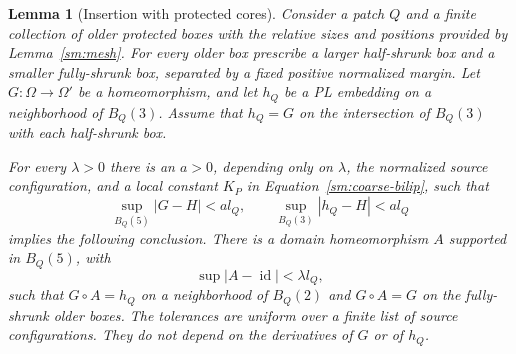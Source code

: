 \documentclass[11pt]{article}
\numberwithin{equation}{section}
\newtheorem{lemma}[theorem]{Lemma}
\theoremstyle{definition}
\theoremstyle{remark}
\begin{document}
\begin{lemma}[Insertion with protected cores]
\label{sm:insertion}
Consider a patch $Q$ and a finite collection of older protected
boxes with the relative sizes and positions provided by
Lemma~\ref{sm:mesh}.  For every older box prescribe a larger
half-shrunk box and a smaller fully-shrunk box, separated by a
fixed positive normalized margin.  Let $G:\Omega\to\Omega'$ be
a homeomorphism, and let $h_Q$ be a PL embedding on a neighborhood
of $B_Q(3)$.  Assume that $h_Q=G$ on the intersection of
$B_Q(3)$ with each half-shrunk box.

For every $\lambda>0$ there is an $a>0$, depending only on
$\lambda$, the normalized source configuration, and a local
constant $K_P$ in Equation~\eqref{sm:coarse-bilip}, such that
\begin{equation}
 \label{sm:insertion-smallness}
 \sup_{B_Q(5)}|G-H|<a l_Q,
 \qquad \sup_{B_Q(3)}|h_Q-H|<a l_Q
\end{equation}
implies the following conclusion.  There is a domain
homeomorphism $A$ supported in $B_Q(5)$, with
\[
 \sup|A-\operatorname{id}|<\lambda l_Q,
\]
such that $G\circ A=h_Q$ on a neighborhood of $B_Q(2)$ and
$G\circ A=G$ on the fully-shrunk older boxes.  The tolerances
are uniform over a finite list of source configurations.  They
do not depend on the derivatives of $G$ or of $h_Q$.
\end{lemma}
\end{document}
